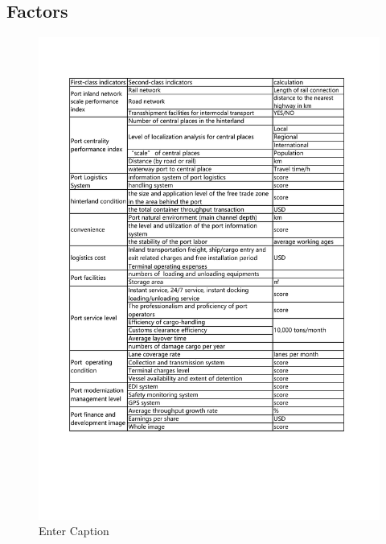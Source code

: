\documentclass[preprint]{elsarticle}
\begin{document}
\subsection{Factors}
\begin{figure}
    \centering
    \includegraphics[width=1\linewidth]{pic/PortRankIndecator.pdf}
    \caption{Enter Caption}
    \label{fig:PortRankIndecator}
\end{figure}
\end{document}
